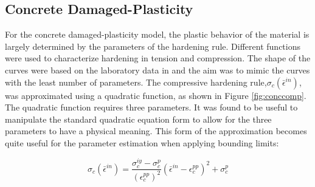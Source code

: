 \subsection{Concrete Damaged-Plasticity}

For the concrete damaged-plasticity model, the plastic behavior of the material is largely determined by the
parameters of the hardening rule. Different functions were used
to characterize hardening in tension and compression. The shape of
the curves were based on the laboratory data in \citet{wahalathantri_material_2011} and the aim was to mimic the curves with the least number of
parameters. The compressive hardening rule,$\sigma_{c}\left(\bar{\epsilon}^{in}\right)$,
was approximated using a quadratic function, as shown in Figure \ref{fig:conccomp}. The
quadratic function requires three parameters. It was found to be useful
to manipulate the standard quadratic equation form to allow for the
three parameters to have a physical meaning. This form of the approximation
becomes quite useful for the parameter estimation when applying bounding
limits:

\begin{equation}
\sigma_{c}\left(\bar{\epsilon}^{in}\right)=\frac{\sigma_{c}^{iy}-\sigma_{c}^{p}}{\left(\epsilon_{c}^{pp}\right)^{2}}\left(\bar{\epsilon}^{in}-\epsilon_{c}^{pp}\right)^{2}+\sigma_{c}^{p}\label{eqn:param2-1}
\end{equation}

